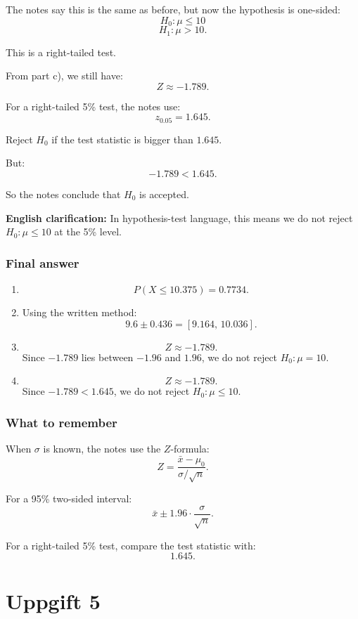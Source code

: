 \documentclass[10pt]{article}
\begin{document}
The notes say this is the same as before, but now
the hypothesis is one-sided:
\[
H_0:\mu\le 10
\]
\[
H_1:\mu>10.
\]

This is a right-tailed test.

From part c), we still have:
\[
Z\approx -1.789.
\]

For a right-tailed 5\% test, the notes use:
\[
z_{0.05}=1.645.
\]

Reject \(H_0\) if the test statistic is bigger
than \(1.645\).

But:
\[
-1.789 < 1.645.
\]

So the notes conclude that \(H_0\) is accepted.

\textbf{English clarification:}
In hypothesis-test language, this means we do not
reject \(H_0:\mu\le 10\) at the 5\% level.

\subsubsection*{Final answer}

\begin{enumerate}[label=\alph*)]
\item
\[
P(X\le 10.375)=0.7734.
\]

\item
Using the written method:
\[
9.6\pm 0.436
= [9.164,\,10.036].
\]

\item
\[
Z\approx -1.789.
\]
Since \(-1.789\) lies between \(-1.96\) and \(1.96\),
we do not reject \(H_0:\mu=10\).

\item
\[
Z\approx -1.789.
\]
Since \(-1.789<1.645\), we do not reject
\(H_0:\mu\le 10\).
\end{enumerate}

\subsubsection*{What to remember}

When \(\sigma\) is known, the notes use the
\(Z\)-formula:
\[
Z=
\frac{\bar{x}-\mu_0}{\sigma/\sqrt{n}}.
\]

For a 95\% two-sided interval:
\[
\bar{x}
\pm
1.96\cdot
\frac{\sigma}{\sqrt{n}}.
\]

For a right-tailed 5\% test, compare the test
statistic with:
\[
1.645.
\]

\section*{Uppgift 5}
\end{document}
